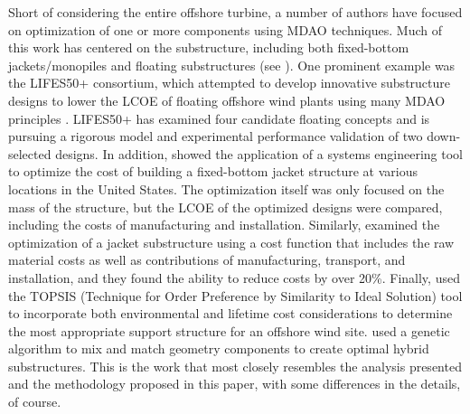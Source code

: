Short of considering the entire offshore turbine, a number of authors
have focused on optimization of one or more components using MDAO
techniques. Much of this work has centered on the substructure,
including both fixed-bottom jackets/monopiles and floating substructures
(see \citep{muskulus2014}). One prominent example was the LIFES50+
consortium, which attempted to develop innovative substructure designs
to lower the LCOE of floating offshore wind plants using many MDAO
principles \citep{lifes50-framework}. LIFES50+ has examined four
candidate floating concepts and is pursuing a rigorous model and
experimental performance validation of two down-selected designs. In
addition, \citet{damiani2016} showed the application of a systems
engineering tool to optimize the cost of building a fixed-bottom jacket
structure at various locations in the United States. The optimization
itself was only focused on the mass of the structure, but the LCOE of
the optimized designs were compared, including the costs of
manufacturing and installation. Similarly, \citet{haafele2016} examined
the optimization of a jacket substructure using a cost function that
includes the raw material costs as well as contributions of
manufacturing, transport, and installation, and they found the ability
to reduce costs by over 20\%. Finally, \citet{lozano2011} used the
TOPSIS (Technique for Order Preference by Similarity to Ideal Solution)
tool to incorporate both environmental and lifetime cost considerations
to determine the most appropriate support structure for an offshore wind
site. \citet{karimi2017} used a genetic algorithm to mix and match
geometry components to create optimal hybrid substructures.  This is the
work that most closely resembles the analysis presented and the
methodology proposed in this paper, with some differences in the
details, of course.

